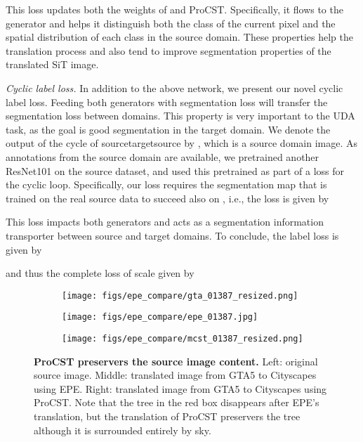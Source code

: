 \documentclass[letterpaper]{article} \usepackage[]{aaai23}  \usepackage{times}  \usepackage{helvet}  \usepackage{courier}  \usepackage[hyphens]{url}  \usepackage{graphicx} \urlstyle{rm} \def\UrlFont{\rm}  \usepackage{natbib}  \usepackage{caption} \frenchspacing  \setlength{\pdfpagewidth}{8.5in} \setlength{\pdfpageheight}{11in} \usepackage{algorithm}
\begin{document}
This loss updates both the weights of  and ProCST. Specifically, it flows to the  generator and helps it distinguish both the class of the current pixel and the spatial distribution of each class in the source domain. These properties help the translation process and also tend to improve segmentation properties of the translated SiT image. 

\textit{Cyclic label loss.} In addition to the above network, we present our novel cyclic label loss. Feeding both generators with segmentation loss will transfer the segmentation loss between domains. This property is very important to the UDA task, as the goal is good segmentation in the target domain. We denote the output of the cycle of sourcetargetsource by , which is a source domain image. As annotations from the source domain are available, we pretrained another ResNet101 on the source dataset, and used this pretrained  as part of a loss for the cyclic  loop. Specifically, our loss requires the segmentation map that is trained on the real source data to succeed also on , i.e., the loss is given by

This loss impacts both generators and acts as a segmentation information transporter between source and target domains. 
To conclude, the label loss is given by

and thus the complete loss of scale  given by 



\begin{figure*}[t]
    \centering
    \begin{subfigure}{0.32\linewidth}
        \centering
        \texttt{[image: figs/epe\_compare/gta\_01387\_resized.png]}
    \end{subfigure}
    \begin{subfigure}{0.32\linewidth}
        \centering
        \texttt{[image: figs/epe\_compare/epe\_01387.jpg]}
    \end{subfigure}
    \begin{subfigure}{0.32\linewidth}
        \centering
        \texttt{[image: figs/epe\_compare/mcst\_01387\_resized.png]}
    \end{subfigure}
    \caption{{\bf ProCST preservers the source image content.} Left: original source image. Middle: translated image from GTA5 to Cityscapes using EPE. Right: translated image from GTA5 to Cityscapes using ProCST. Note that the tree in the red box disappears after EPE's translation, but the translation of ProCST preservers the tree although it is surrounded entirely by sky.}
    \label{fig:epe_compare}
\end{figure*}
\end{document}
